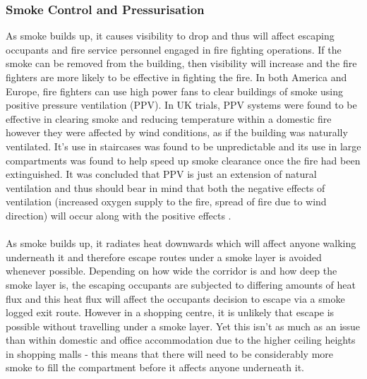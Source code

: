 \documentclass[table,a4paper,oneside]{book}
\begin{document}
\subsubsection{Smoke Control and Pressurisation}
As smoke builds up, it causes visibility to drop and thus will affect escaping occupants and fire service personnel engaged in fire fighting operations. If the smoke can be removed from the building, then visibility will increase and the fire fighters are more likely to be effective in fighting the fire. In both America and Europe, fire fighters can use high power fans to clear buildings of smoke using positive pressure ventilation (PPV). In UK trials, PPV systems were found to be effective in clearing smoke and reducing temperature within a domestic fire however they were affected by wind conditions, as if the building was naturally ventilated. It's use in staircases was found to be unpredictable and its use in large compartments was found to help speed up smoke clearance once the fire had been extinguished. It was concluded that PPV is just an extension of natural ventilation and thus should bear in mind that both the negative effects of ventilation (increased oxygen supply to the fire, spread of fire due to wind direction) will occur along with the positive effects \citep{Rimen2000}.
\\
\\
As smoke builds up, it radiates heat downwards which will affect anyone walking underneath it and therefore escape routes under a smoke layer is avoided whenever possible. Depending on how wide the corridor is and how deep the smoke layer is, the escaping occupants are subjected to differing amounts of heat flux \citep{Wong2005} and this heat flux will affect the occupants decision to escape via a smoke logged exit route. However in a shopping centre, it is unlikely that escape is possible without travelling under a smoke layer. Yet this isn't as much as an issue than within domestic and office accommodation due to the higher ceiling heights in shopping malls - this means that there will need to be considerably more smoke to fill the compartment before it affects anyone underneath it.
\\
\\
\end{document}
